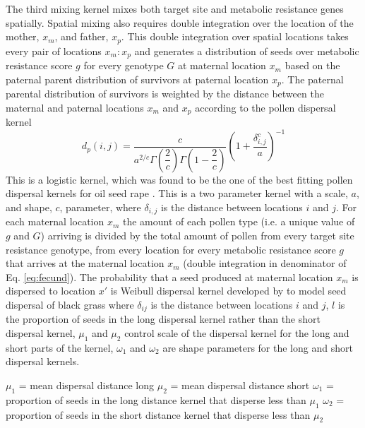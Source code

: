 \documentclass[12pt, a4paper]{article}
\begin{document}
The third mixing kernel mixes both target site and metabolic resistance genes spatially. Spatial mixing also requires double integration over the location of the mother, $x_m$, and father, $x_p$. This double integration over spatial locations takes every pair of locations $x_m:x_p$ and generates a distribution of seeds over metabolic resistance score $g$ for every genotype $G$ at maternal location $x_m$ based on the paternal parent distribution of survivors at paternal location $x_p$. The paternal parental distribution of survivors is weighted by the distance between the maternal and paternal locations $x_m$ and $x_p$ according to the pollen dispersal kernel 
\begin{equation}\label{eq:pollen_disp}
	d_p(i, j) = \frac{c}{a^{2/c}\Gamma\left(\dfrac{2}{c} \right)\Gamma\left(1 - \dfrac{2}{c} \right)}\left( 1 + \dfrac{\delta_{i,j}^c}{a} \right)^{-1} 
\end{equation} 
This is a logistic kernel, which was found to be the one of the best fitting pollen dispersal kernels for oil seed rape \citep{Klei2006}. This is a two parameter kernel with a scale, $a$, and shape, $c$, parameter, where $\delta_{i,j}$ is the distance between locations $i$ and $j$. For each maternal location $x_m$ the amount of each pollen type (i.e. a unique value of $g$ and $G$) arriving is divided by the total amount of pollen from every target site resistance genotype, from every location for every metabolic resistance score $g$ that arrives at the maternal location $x_m$ (double integration in denominator of Eq. \ref{eq:fecund}). The probability that a seed produced at maternal location $x_m$ is dispersed to location $x'$ is 
Weibull dispersal kernel developed by \cite{Colb2001} to model seed dispersal of black grass where $\delta_{ij}$ is the distance between locations $i$ and $j$, $l$ is the proportion of seeds in the long dispersal kernel rather than the short dispersal kernel, $\mu_1$ and $\mu_2$ control scale of the dispersal kernel for the long and short parts of the kernel, $\omega_1$ and $\omega_2$ are shape parameters for the long and short dispersal kernels.    

$\mu_1$ = mean dispersal distance long
$\mu_2$ = mean dispersal distance short
$\omega_1$ = proportion of seeds in the long distance kernel that disperse less than $\mu_1$
$\omega_2$ = proportion of seeds in the short distance kernel that disperse less than $\mu_2$
\end{document}
